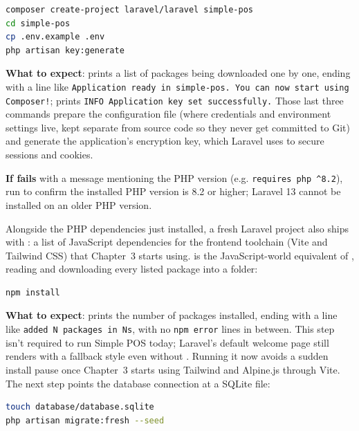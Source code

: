 \begin{lstlisting}[language=bash]
composer create-project laravel/laravel simple-pos
cd simple-pos
cp .env.example .env
php artisan key:generate
\end{lstlisting}

\textbf{What to expect}:  prints a list of
packages being downloaded one by one, ending with a line like
\texttt{Application ready in simple-pos. You can now start using
Composer!};  prints
\texttt{INFO Application key set successfully.} Those last three commands
prepare the  configuration file
(where credentials and environment settings live, kept separate from
source code so they never get committed to Git) and generate the
application's encryption key, which Laravel uses to secure sessions and
cookies.

\begin{tipbox}
\textbf{If  fails} with a message
mentioning the PHP version (e.g. \texttt{requires php \textasciicircum{}8.2}),
run
 to confirm the installed PHP version is 8.2 or higher;
Laravel 13 cannot be installed on an older PHP version.
\end{tipbox}

Alongside the PHP dependencies  just installed, a fresh
Laravel project also ships with : a list of JavaScript
dependencies for the frontend toolchain (Vite and Tailwind CSS) that
Chapter~3 starts using.  is the JavaScript-world
equivalent of , reading  and
downloading every listed package into a  folder:

\begin{lstlisting}[language=bash]
npm install
\end{lstlisting}

\textbf{What to expect}:  prints the number of packages
installed, ending with a line like \texttt{added N packages in Ns}, with
no \texttt{npm error} lines in between. This step isn't required to run Simple POS today; Laravel's default
welcome page still renders with a fallback style even without
. Running it now avoids a sudden install pause once
Chapter~3 starts using Tailwind and Alpine.js through Vite. The next step
points the database connection at a SQLite file:

\begin{lstlisting}[language=bash]
touch database/database.sqlite
php artisan migrate:fresh --seed
\end{lstlisting}

